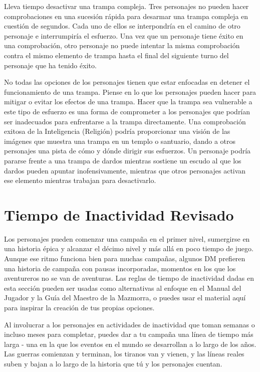 \documentclass[a4paper,twocolumn,openany,10pt]{dndbook}
\begin{document}
Lleva tiempo desactivar una trampa compleja. Tres personajes no pueden hacer comprobaciones en una sucesión rápida para desarmar
una trampa compleja en cuestión de segundos. Cada uno de ellos se interpondría en el camino de otro personaje e interrumpiría el
esfuerzo. Una vez que un personaje tiene éxito en una comprobación, otro personaje no puede intentar la misma comprobación
contra el mismo elemento de trampa hasta el final del siguiente turno del personaje que ha tenido éxito.

No todas las opciones de los personajes tienen que estar enfocadas en detener el funcionamiento de una trampa. Piense en lo que
los personajes pueden hacer para mitigar o evitar los efectos de una trampa. Hacer que la trampa sea vulnerable a este tipo de
esfuerzo es una forma de comprometer a los personajes que podrían ser inadecuados para enfrentarse a la trampa directamente. Una
comprobación exitosa de la Inteligencia (Religión) podría proporcionar una visión de las imágenes que muestra una trampa en un
templo o santuario, dando a otros personajes una pista de cómo y dónde dirigir sus esfuerzos. Un personaje podría pararse frente
a una trampa de dardos mientras sostiene un escudo al que los dardos pueden apuntar inofensivamente, mientras que otros
personajes activan ese elemento mientras trabajan para desactivarlo. 

\section{Tiempo de Inactividad Revisado}
Los personajes pueden comenzar una campaña en el primer nivel, sumergirse en una historia épica y alcanzar el décimo nivel y más
allá en poco tiempo de juego. Aunque ese ritmo funciona bien para muchas campañas, algunos DM prefieren una historia de campaña
con pausas incorporadas, momentos en los que los aventureros no se van de aventuras. Las reglas de tiempo de inactividad dadas
en esta sección pueden ser usadas como alternativas al enfoque en el Manual del Jugador y la Guía del Maestro de la Mazmorra, o
puedes usar el material aquí para inspirar la creación de tus propias opciones.

Al involucrar a los personajes en actividades de inactividad que toman semanas o incluso meses para completar, puedes dar a tu
campaña una línea de tiempo más larga - una en la que los eventos en el mundo se desarrollan a lo largo de los años. Las guerras
comienzan y terminan, los tiranos van y vienen, y las líneas reales suben y bajan a lo largo de la historia que tú y los
personajes cuentan.
\end{document}
